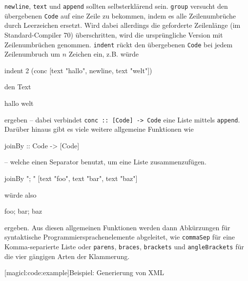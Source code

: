\documentclass[12pt, a4paper, bibgerm]{scrbook}
\newenvironment{DIFnomarkup}{}{}
\newcommand\icode[1]{\lstinline?#1?}
\newcommand\lsubsubsection{}
\begin{document}
\icode{newline}, \icode{text} und \icode{append} sollten selbsterklärend
sein. \icode{group} versucht den übergebenen \icode{Code} auf eine Zeile
zu bekommen, indem es alle Zeilenumbrüche durch Leerzeichen
ersetzt. Wird dabei allerdings die geforderte Zeilenlänge (im
Standard-Compiler 70) überschritten, wird die ursprüngliche Version mit
Zeilenumbrüchen genommen. \icode{indent} rückt den übergebenen
\icode{Code} bei jedem Zeilenumbruch um $n$ Zeichen ein, z.B. würde
\begin{DIFnomarkup}\begin{code}
indent 2 (conc [text "hallo", newline, text "welt"])
\end{code}\end{DIFnomarkup}
den Text
\begin{DIFnomarkup}\begin{code}
hallo
  welt
\end{code}\end{DIFnomarkup}
ergeben -- dabei verbindet \icode{conc :: [Code] -> Code} eine Liste
mittels \icode{append}. Darüber hinaus gibt es viele weitere allgemeine
Funktionen wie
\begin{DIFnomarkup}\begin{code}
  joinBy :: Code -> [Code]
\end{code}\end{DIFnomarkup}
-- welche einen Separator benutzt, um eine Liste zusammenzufügen.
\begin{DIFnomarkup}\begin{code}
joinBy "; " [text "foo", text "bar", text "baz"]
\end{code}\end{DIFnomarkup}
würde also
\begin{DIFnomarkup}\begin{code}
foo; bar; baz
\end{code}\end{DIFnomarkup}
ergeben. Aus diesen allgemeinen Funktionen werden dann Abkürzungen für
syntaktische Programmiersprachenelemente abgeleitet, wie
\icode{commaSep} für eine Komma-separierte Liste oder \icode{parens},
\icode{braces}, \icode{brackets} und \icode{angleBrackets} für die vier
gängigen Arten der Klammerung.

\lsubsubsection[magicl:code:example]{Beispiel: Generierung von XML}
\end{document}
